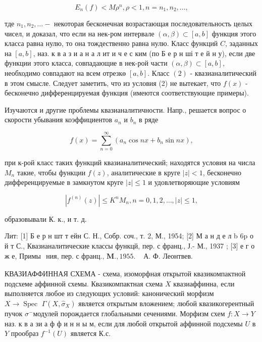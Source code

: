 \documentclass[10pt]{article}
\begin{document}
\[

E_{n}(f)<M \rho^{n}, \rho<1, n=n_{1}, n_{2}, \ldots,

\]



тде $n_{1}, n_{2}, \ldots-$ некоторая бесконечная возрастающая последовательность целых чисел, и доказал, что если на нек-ром интервале $(\alpha, \beta) \subset[a, b]$ функция этого класса равна нулю, то она тождественно равна нулю. Класс функций $C$, заданных на $[a, b]$, наз. к в а з и а н а л ит и ч е с ким (по Б е р н ші т е й н у), если две функции этого класса, совпадающие в нек-рой части $(\alpha, \beta) \subset[a, b]$, необходимо совпадают на всем отрезкө $[a, b]$. Класс $(2)$ - квазианалитический в этом смысле. Следует заметить, что из условия (2) не вытекает, что $f(x)$ - бесконечно дифференцируемая функция (имеются соответствующие примеры).



Изучаются и другие проблемы квазианалитичности. Напр., решается вопрос о скорости убывания коэффициентов $a_{n}$ и $b_{n}$ в ряде



\[

f(x)=\sum_{n=0}^{\infty}\left(a_{n} \cos n x+b_{n} \sin n x\right),

\]



при к-рой класс таких функций квазианалитический; находятся условия на числа $M_{n}$ такие, чтобы функции $f(z)$, аналитические в круге $|z|<1$, бесконечно дифференцируемые в замкнутом круге $|z| \leqslant 1$ и удовлетворяющие условиям



\[

\left|f^{(n)}(z)\right| \leqslant K^{n} M_{n}, n=0,1,2, \ldots,|z| \leqslant 1,

\]



образовывали К. к., и т. д.



Лит: [1] Б е р н шт т ейн С. Н., Собр. соч., т. 2, М., 1954; [2] М а н д е л b $6 \mathrm{p}$ о й т С., Квазианалитические классы функцй, пер. с франц., Ј.- М., 1937 ; [3] е г о ж е, Примы$\begin{array}{ll}\text { ния, пер. с франц., } \mathbf{M} ., 1955 . & \text { А. Ф. Леонтвев. }\end{array}$



КВАЗИАФФИННАЯ СХЕМА - схема, изоморфная открытой квазикомпактной подсхеме аффинной схемы. Квазикомпактная схема $X$ квазиаффинна, если выполняется любое из следующих условий: канонический морфизм $X \rightarrow \operatorname{Spec~} \Gamma\left(X, \hat{\sigma}_{X}\right)$ является открытым вложением; любой квазикогерентный пучок $\sigma^{-}$модулей порождается глобальными сечениями. Морфизм схем $f: X \rightarrow Y$ наз. к в а зи а ф ф и н н ы м, если для любой открытой аффинной подсхемы $U$ в $Y$ прообраз $f^{-1}(U)$ является К.с.
\end{document}
